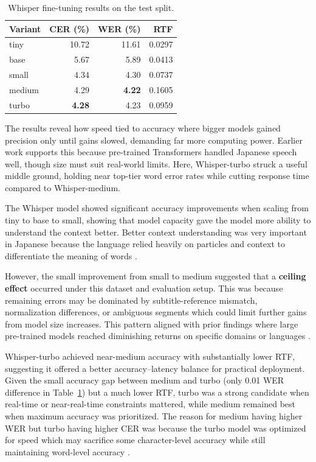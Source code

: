 \begin{table}[H]
\centering
\caption{Whisper fine-tuning results on the test split.}
\label{tab:whisper_results}
{\small
\setlength{\tabcolsep}{6pt}
\renewcommand{\arraystretch}{1.2}
\begin{tabular}{lrrr}
\hline
\textbf{Variant} & \textbf{CER (\%)} & \textbf{WER (\%)} & \textbf{RTF} \\
\hline
tiny   & 10.72 & 11.61 & 0.0297 \\
base   &  5.67 &  5.89 & 0.0413 \\
small  &  4.34 &  4.30 & 0.0737 \\
medium &  4.29 &  \textbf{4.22} & 0.1605 \\
turbo  &  \textbf{4.28} & 4.23 & 0.0959 \\ 
\hline
\end{tabular}}
\end{table}

The results reveal how speed tied to accuracy where bigger models gained precision only until gains slowed, demanding far more computing power. Earlier work supports this because pre-trained Transformers handled Japanese speech well, though size must suit real-world limits. Here, Whisper-turbo struck a useful middle ground, holding near top-tier word error rates while cutting response time compared to Whisper-medium.

The Whisper model showed significant accuracy improvements when scaling from tiny to base to small, showing that model capacity gave the model more ability to understand the context better. Better context understanding was very important in Japanese because the language relied heavily on particles and context to differentiate the meaning of words \parencite{radford2023robust}.

However, the small improvement from small to medium suggested that a \textbf{ceiling effect} occurred under this dataset and evaluation setup. This was because remaining errors may be dominated by subtitle-reference mismatch, normalization differences, or ambiguous segments which could limit further gains from model size increases. This pattern aligned with prior findings where large pre-trained models reached diminishing returns on specific domains or languages \parencite{bajo2024efficient}. 

Whisper-turbo achieved near-medium accuracy with substantially lower RTF, suggesting it offered a better accuracy--latency balance for practical deployment. Given the small accuracy gap between medium and turbo (only 0.01 WER difference in Table~\ref{tab:whisper_results}) but a much lower RTF, turbo was a strong candidate when real-time or near-real-time constraints mattered, while medium remained best when maximum accuracy was prioritized. The reason for medium having higher WER but turbo having higher CER was because the turbo model was optimized for speed which may sacrifice some character-level accuracy while still maintaining word-level accuracy \parencite{radford2023robust}.

